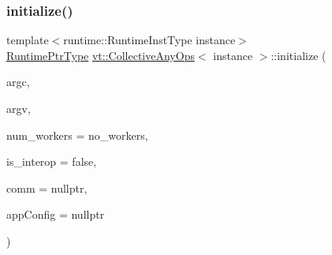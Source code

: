 \mbox{\label{structvt_1_1_collective_any_ops_ae0b57c10a49875db49abc536a2a5c19c}} 
\subsubsection{\texorpdfstring{initialize()}{initialize()}}
{\footnotesize\ttfamily template$<$runtime\+::\+Runtime\+Inst\+Type instance$>$ \\
\hyperlink{namespacevt_a0ce60e0299d8fa32223b3b9ffa0af466}{Runtime\+Ptr\+Type} \hyperlink{structvt_1_1_collective_any_ops}{vt\+::\+Collective\+Any\+Ops}$<$ instance $>$\+::initialize (\begin{DoxyParamCaption}\item[{int \&}]{argc,  }\item[{char $\ast$$\ast$\&}]{argv,  }\item[{\hyperlink{namespacevt_aa93398ea48f2cb6c188512250f7cc248}{Worker\+Count\+Type} const}]{num\+\_\+workers = {\ttfamily no\+\_\+workers},  }\item[{bool}]{is\+\_\+interop = {\ttfamily false},  }\item[{M\+P\+I\+\_\+\+Comm $\ast$}]{comm = {\ttfamily nullptr},  }\item[{\hyperlink{structvt_1_1arguments_1_1_app_config}{arguments\+::\+App\+Config} const $\ast$}]{app\+Config = {\ttfamily nullptr} }\end{DoxyParamCaption})\hspace{0.3cm}{\ttfamily [static]}}

\mbox{\label{structvt_1_1_collective_any_ops_a5ae4676659166ab1e1ac7334776d58c3}} 
